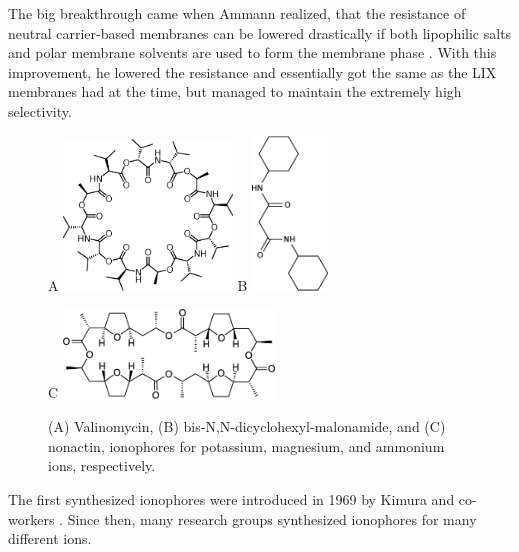 The big breakthrough came when Ammann realized, that the resistance of neutral carrier-based membranes can be lowered drastically if both lipophilic salts and polar membrane solvents are used to form the membrane phase \cite{ammann1987valinomycin}.
With this improvement, he lowered the resistance and essentially got the same as the LIX membranes had at the time, but managed to maintain the extremely high selectivity.


\begin{figure}[h]
\centering
A \includegraphics[width=0.4\textwidth]{img/theory/Valinomycin.eps}\hspace{1cm} B \includegraphics[width=0.18\textwidth]{img/theory/mg_ionophore.eps}

\vspace{1cm}

C \includegraphics[width=0.5\textwidth]{img/theory/Nonactin.eps}
\caption{(A) Valinomycin, (B) bis-N,N-dicyclohexyl-malonamide, and (C) nonactin, ionophores for potassium, magnesium, and ammonium ions, respectively.}
\label{fig:ionophores}
\end{figure}

The first synthesized ionophores were introduced in 1969 by Kimura and co-workers \cite{kimura1979potassium}.
Since then, many research groups synthesized ionophores for many different ions.

